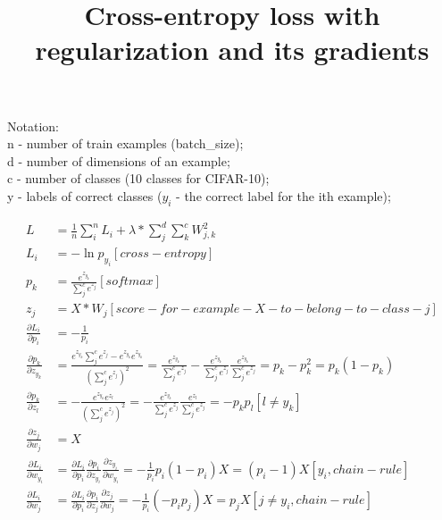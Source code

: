 \documentclass{article}
\title{Cross-entropy loss with regularization and its gradients}
\author{}
\date{\vspace{-5ex}}
\begin{document}
  \maketitle
  
  Notation:\\
  n - number of train examples (batch\_size);\\
  d - number of dimensions of an example;\\
  c - number of classes (10 classes for CIFAR-10);\\
  y - labels of correct classes ($y_{i}$ - the correct label for the ith example);

  \begin{align*}
  L &= \frac{1}{n} \sum_{i}^{n} L_{i} 
       + \lambda * \sum_{j}^{d} \sum_{k}^{c} W_{j,k}^{2}\\
  L_{i} &= -\ln{p_{y_{i}}} [cross-entropy]\\
  p_{k} &= \frac {e^{z_{y_{k}}}}{\sum_{j}^{c} e^{z_{j}}} [softmax]\\
  z_{j} &= X * W_{j} [score-for-example-X-to-belong-to-class-j]\\
  \frac {\partial L_{i}}{\partial p_{i}} &= -\frac {1}{p_{i}}\\
  \frac {\partial p_{k}}{\partial z_{y_{k}}} &= 
        \frac {e^{z_{y_{k}}}\sum_{j}^{c} e^{z_{j}} - e^{z_{y_{k}}}e^{z_{y_{k}}}}
              {(\sum_{j}^{c} e^{z_{j}})^2} 
      = \frac {e^{z_{y_{k}}}}{\sum_{j}^{c} e^{z_{j}}}
        -
        \frac {e^{z_{y_{k}}}}{\sum_{j}^{c} e^{z_{j}}}
        \frac {e^{z_{y_{k}}}}{\sum_{j}^{c} e^{z_{j}}}
      = p_{k} - p_{k}^2
      = p_{k}(1 - p_{k})\\
  \frac {\partial p_{k}}{\partial z_{l}} &= 
        -\frac {e^{z_{y_{k}}}e^{z_{l}}}
               {(\sum_{j}^{c} e^{z_{j}})^2}
       = -\frac {e^{z_{y_{k}}}}{\sum_{j}^{c} e^{z_{j}}}
          \frac {e^{z_{l}}}{\sum_{j}^{c} e^{z_{j}}} 
       = -p_{k}p_{l} [l \neq y_{k}]\\
  \frac {\partial z_{j}}{\partial w_{j}} &= X\\
  \frac {\partial L_{i}}{\partial w_{y_{i}}} &=
         \frac {\partial L_{i}}{\partial p_{i}}
         \frac {\partial p_{i}}{\partial z_{y_{i}}}
         \frac {\partial z_{y_{i}}}{\partial w_{y_{i}}}
      = -\frac {1}{p_{i}}{p_{i}}(1 - p_{i})X
      = (p_{i} - 1)X [y_{i}, chain- rule]\\
  \frac {\partial L_{i}}{\partial w_{j}} &=
         \frac {\partial L_{i}}{\partial p_{i}}
         \frac {\partial p_{i}}{\partial z_{j}}
         \frac {\partial z_{j}}{\partial w_{j}}
      = -\frac {1}{p_{i}}(-p_{i}p_{j})X
      = p_{j}X [j \neq y_{i}, chain- rule]
  \end{align*}
\end{document}
